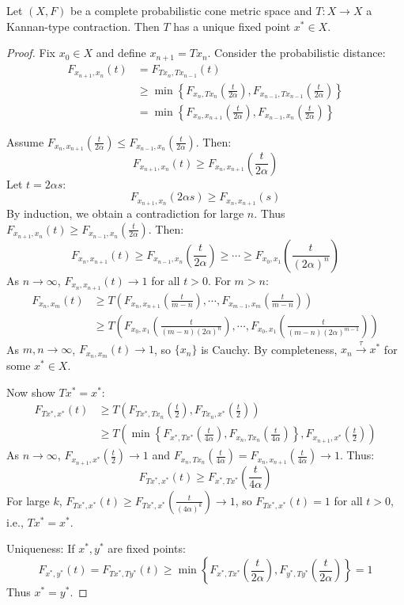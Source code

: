 \documentclass[10pt,a4paper]{amsart}
\begin{document}
\begin{theorem}\label{thm:kannan-pcm}
Let $(X,F)$ be a complete probabilistic cone metric space and $T: X \to X$ a Kannan-type contraction. Then $T$ has a unique fixed point $x^* \in X$.
\end{theorem}

\begin{proof}
Fix $x_0 \in X$ and define $x_{n+1} = Tx_n$. Consider the probabilistic distance:
\begin{align*}
F_{x_{n+1},x_n}(t) &= F_{Tx_n,Tx_{n-1}}(t) \\
&\geq \min\left\{ F_{x_n,Tx_n}\left(\frac{t}{2\alpha}\right), F_{x_{n-1},Tx_{n-1}}\left(\frac{t}{2\alpha}\right) \right\} \\
&= \min\left\{ F_{x_n,x_{n+1}}\left(\frac{t}{2\alpha}\right), F_{x_{n-1},x_n}\left(\frac{t}{2\alpha}\right) \right\}
\end{align*}



Assume $F_{x_n,x_{n+1}}\left(\frac{t}{2\alpha}\right) \leq F_{x_{n-1},x_n}\left(\frac{t}{2\alpha}\right)$. Then:
\[
F_{x_{n+1},x_n}(t) \geq F_{x_n,x_{n+1}}\left(\frac{t}{2\alpha}\right)
\]
Let $t = 2\alpha s$:
\[
F_{x_{n+1},x_n}(2\alpha s) \geq F_{x_n,x_{n+1}}(s)
\]
By induction, we obtain a contradiction for large $n$. Thus $F_{x_{n+1},x_n}(t) \geq F_{x_{n-1},x_n}\left(\frac{t}{2\alpha}\right)$. Then:
\[
F_{x_n,x_{n+1}}(t) \geq F_{x_{n-1},x_n}\left(\frac{t}{2\alpha}\right) \geq \cdots \geq F_{x_0,x_1}\left(\frac{t}{(2\alpha)^n}\right)
\]
As $n \to \infty$, $F_{x_n,x_{n+1}}(t) \to 1$ for all $t > 0$. For $m > n$:
\begin{align*}
F_{x_n,x_m}(t) &\geq T\left(F_{x_n,x_{n+1}}\left(\frac{t}{m-n}\right), \cdots, F_{x_{m-1},x_m}\left(\frac{t}{m-n}\right)\right) \\
&\geq T\left(F_{x_0,x_1}\left(\frac{t}{(m-n)(2\alpha)^n}\right), \cdots, F_{x_0,x_1}\left(\frac{t}{(m-n)(2\alpha)^{m-1}}\right)\right)
\end{align*}
As $m,n \to \infty$, $F_{x_n,x_m}(t) \to 1$, so $\{x_n\}$ is Cauchy. By completeness, $x_n \xrightarrow{\tau} x^*$ for some $x^* \in X$.

Now show $Tx^* = x^*$:
\begin{align*}
F_{Tx^*,x^*}(t) &\geq T\left(F_{Tx^*,Tx_n}\left(\frac{t}{2}\right), F_{Tx_n,x^*}\left(\frac{t}{2}\right)\right) \\
&\geq T\left(\min\left\{F_{x^*,Tx^*}\left(\frac{t}{4\alpha}\right), F_{x_n,Tx_n}\left(\frac{t}{4\alpha}\right)\right\}, F_{x_{n+1},x^*}\left(\frac{t}{2}\right)\right)
\end{align*}
As $n \to \infty$, $F_{x_{n+1},x^*}\left(\frac{t}{2}\right) \to 1$ and $F_{x_n,Tx_n}\left(\frac{t}{4\alpha}\right) = F_{x_n,x_{n+1}}\left(\frac{t}{4\alpha}\right) \to 1$. Thus:
\[
F_{Tx^*,x^*}(t) \geq F_{x^*,Tx^*}\left(\frac{t}{4\alpha}\right)
\]
For large $k$, $F_{Tx^*,x^*}(t) \geq F_{Tx^*,x^*}\left(\frac{t}{(4\alpha)^k}\right) \to 1$, so $F_{Tx^*,x^*}(t) = 1$ for all $t > 0$, i.e., $Tx^* = x^*$.

Uniqueness: If $x^*, y^*$ are fixed points:
\[
F_{x^*,y^*}(t) = F_{Tx^*,Ty^*}(t) \geq \min\left\{F_{x^*,Tx^*}\left(\frac{t}{2\alpha}\right), F_{y^*,Ty^*}\left(\frac{t}{2\alpha}\right)\right\} = 1
\]
Thus $x^* = y^*$.
\end{proof}
\end{document}

